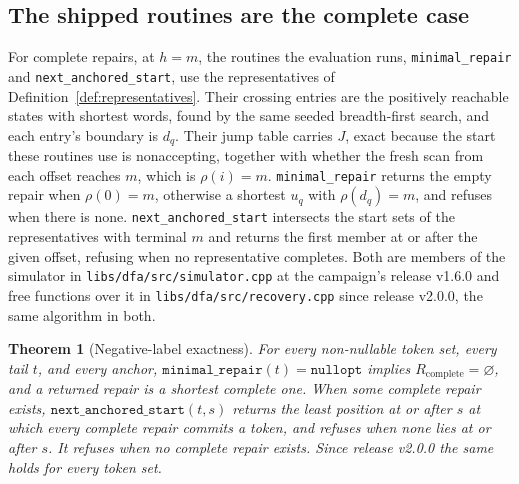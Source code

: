 \documentclass[11pt,a4paper]{article}
\theoremstyle{definition}
\theoremstyle{plain}
\newtheorem{theorem}{Theorem}
\theoremstyle{remark}
\newcommand{\code}[1]{\texttt{#1}}
\newcommand{\Rcomp}{R_{\mathrm{complete}}}
\begin{document}
\subsection{The shipped routines are the complete case}

For complete repairs, at $h = m$, the routines the evaluation runs, \code{minimal\_repair} and
\code{next\_anchored\_start}, use the representatives of Definition~\ref{def:representatives}. Their crossing entries
are the positively reachable states with shortest words, found by the same seeded breadth-first search, and each entry's
boundary is $d_q$. Their jump table carries $J$, exact because the start these routines use is nonaccepting, together
with whether the fresh scan from each offset reaches $m$, which is $\rho(i) = m$. \code{minimal\_repair} returns the
empty repair when $\rho(0) = m$, otherwise a shortest $u_q$ with $\rho(d_q) = m$, and refuses when there is none.
\code{next\_anchored\_start} intersects the start sets of the representatives with terminal $m$ and returns the first
member at or after the given offset, refusing when no representative completes. Both are members of the simulator in
\code{libs/dfa/src/simulator.cpp} at the campaign's release v1.6.0 and free functions over it in
\code{libs/dfa/src/recovery.cpp} since release v2.0.0, the same algorithm in both.

\begin{theorem}[Negative-label exactness]
\label{thm:labels}
For every non-nullable token set, every tail $t$, and every anchor, $\code{minimal\_repair}(t) = \code{nullopt}$ implies
$\Rcomp = \varnothing$, and a returned repair is a shortest complete one. When some complete repair exists,
$\code{next\_anchored\_start}(t, s)$ returns the least position at or after $s$ at which every complete repair commits a
token, and refuses when none lies at or after $s$. It refuses when no complete repair exists. Since release v2.0.0 the
same holds for every token set.
\end{theorem}
\end{document}

